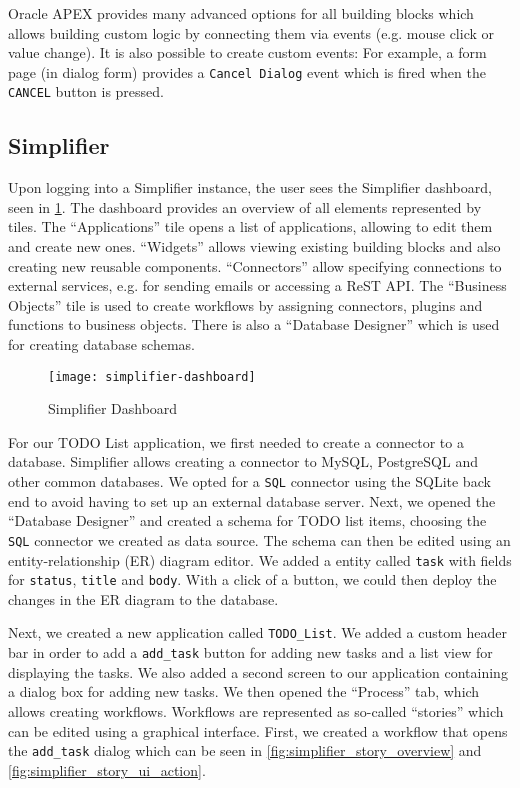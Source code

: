 \documentclass[runningheads]{llncs}
\begin{document}
Oracle APEX provides many advanced options for all building blocks which allows building custom logic by connecting them via events (e.g. mouse click or value change). It is also possible to create custom events: For example, a form page (in dialog form) provides a \texttt{Cancel Dialog} event which is fired when the \texttt{CANCEL} button is pressed.

\subsection{Simplifier}

Upon logging into a Simplifier instance, the user sees the Simplifier dashboard, seen in \cref{fig:simplifier_dashboard}. The dashboard provides an overview of all elements represented by tiles. The “Applications” tile opens a list of applications, allowing to edit them and create new ones. “Widgets” allows viewing existing building blocks and also creating new reusable components. “Connectors” allow specifying connections to external services, e.g. for sending emails or accessing a ReST API. The “Business Objects” tile is used to create workflows by assigning connectors, plugins and functions to business objects. There is also a “Database Designer” which is used for creating database schemas.

\begin{figure}
  \centering
  \texttt{[image: simplifier-dashboard]}
  \caption{Simplifier Dashboard}
  \label{fig:simplifier_dashboard}
\end{figure}

For our TODO List application, we first needed to create a connector to a database. Simplifier allows creating a connector to MySQL, PostgreSQL and other common databases. We opted for a \texttt{SQL} connector using the SQLite back end to avoid having to set up an external database server. Next, we opened the “Database Designer” and created a schema for TODO list items, choosing the \texttt{SQL} connector we created as data source. The schema can then be edited using an entity-relationship (ER) diagram editor. We added a entity called \texttt{task} with fields for \texttt{status}, \texttt{title} and \texttt{body}. With a click of a button, we could then deploy the changes in the ER diagram to the database.

Next, we created a new application called \texttt{TODO\_List}. We added a custom header bar in order to add a \texttt{add\_task} button for adding new tasks and a list view for displaying the tasks. We also added a second screen to our application containing a dialog box for adding new tasks. We then opened the “Process” tab, which allows creating workflows. Workflows are represented as so-called “stories” which can be edited using a graphical interface. First, we created a workflow that opens the \texttt{add\_task} dialog which can be seen in \cref{fig:simplifier_story_overview} and \cref{fig:simplifier_story_ui_action}.
\end{document}

